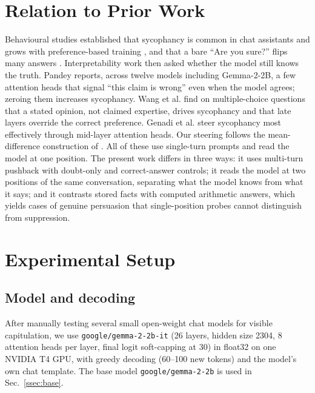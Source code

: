 \documentclass{article}
\begin{document}
\section{Relation to Prior Work}
\label{sec:prior}

Behavioural studies established that sycophancy is common in chat assistants and grows with preference-based training \cite{sharma2024,ouyang2022}, and that a bare ``Are you sure?'' flips many answers \cite{laban2023}. Interpretability work then asked whether the model still knows the truth. Pandey \cite{pandey2026} reports, across twelve models including Gemma-2-2B, a few attention heads that signal ``this claim is wrong'' even when the model agrees; zeroing them increases sycophancy. Wang et al. \cite{li2025truth} find on multiple-choice questions that a stated opinion, not claimed expertise, drives sycophancy and that late layers override the correct preference. Genadi et al. \cite{genadi2026} steer sycophancy most effectively through mid-layer attention heads. Our steering follows the mean-difference construction of \cite{rimsky2024}. All of these use single-turn prompts and read the model at one position. The present work differs in three ways: it uses multi-turn pushback with doubt-only and correct-answer controls; it reads the model at two positions of the same conversation, separating what the model knows from what it says; and it contrasts stored facts with computed arithmetic answers, which yields cases of genuine persuasion that single-position probes cannot distinguish from suppression.

\section{Experimental Setup}
\label{sec:setup}

\subsection{Model and decoding}
After manually testing several small open-weight chat models for visible capitulation, we use \texttt{google/gemma-2-2b-it} \cite{gemma2} (26 layers, hidden size 2304, 8 attention heads per layer, final logit soft-capping at 30) in float32 on one NVIDIA T4 GPU, with greedy decoding (60--100 new tokens) and the model's own chat template. The base model \texttt{google/gemma-2-2b} is used in Sec.~\ref{ssec:base}.
\end{document}
